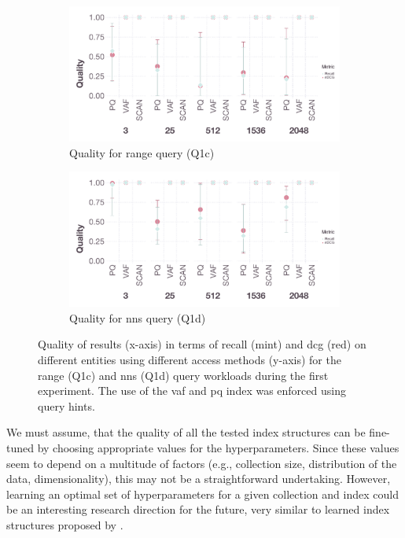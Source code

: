 \begin{figure}[tb]
    \centering
    \begin{subfigure}[b]{\textwidth}
        \centering
        \includegraphics[width=\textwidth]{figures/analytics/analytics-cottontail-quality-range}
        \caption{Quality for range query (Q1c)}
        \label{figure:cottontail_analytics_quality_range}
    \end{subfigure}
    \hfill
    \centering
    \begin{subfigure}[b]{\textwidth}
        \centering
        \includegraphics[width=\textwidth]{figures/analytics/analytics-cottontail-quality-nns}
        \caption{Quality for \acrshort{nns} query (Q1d)}
        \label{figure:cottontail_analytics_quality_nns}
    \end{subfigure}
    \caption{Quality of results (x-axis) in terms of recall (mint) and \acrshort{dcg} (red) on different entities using different access methods (y-axis) for the range (Q1c) and \acrshort{nns} (Q1d) query workloads during the first experiment. The use of the \acrshort{vaf} and \acrshort{pq} index was enforced using query hints.}
    \label{figure:cottontail_analytics_quality}
\end{figure}

We must assume, that the quality of all the tested index structures can be fine-tuned by choosing appropriate values for the hyperparameters. Since these values seem to depend on a multitude of factors (e.g., collection size, distribution of the data, dimensionality), this may not be a straightforward undertaking. However, learning an optimal set of hyperparameters for a given collection and index  could be an interesting research direction for the future, very similar to learned index structures proposed by \cite{Kraska:2018Case}.

